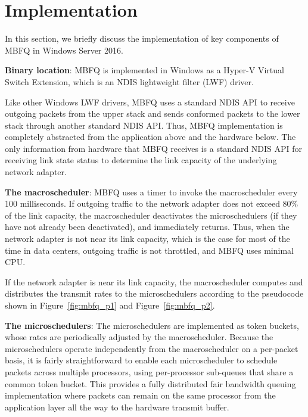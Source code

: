 \section{Implementation}
\label{sec:implementation}
In this section, we briefly discuss the implementation of key components of MBFQ in Windows
Server 2016.

{\bf Binary location}: MBFQ is implemented in Windows as a Hyper-V Virtual Switch Extension, 
which is an NDIS lightweight filter (LWF) driver.

Like other Windows LWF drivers, MBFQ uses a standard NDIS API to receive outgoing packets
from the upper stack and 
sends conformed packets to the lower stack through another standard NDIS API.
Thus, MBFQ implementation is completely abstracted from the application above and the 
hardware below.  The only information from hardware that MBFQ receives is a standard NDIS API 
for receiving link state status to determine the link capacity of the underlying network adapter.

{\bf The macroscheduler}: MBFQ uses a timer to invoke the macroscheduler every 100 milliseconds.
If outgoing traffic to the network adapter does not exceed 80\% of the link capacity, the
macroscheduler deactivates the microschedulers (if they have not already been deactivated), and
immediately returns.  Thus, when the network adapter is not near its link capacity, which is the case
for most of the time in data centers, outgoing traffic is not throttled, and MBFQ uses minimal CPU.

If the network adapter is near its link capacity, the macroscheduler computes and distributes the
transmit rates to the microschedulers according to the pseudocode shown in  
Figure~\ref{fig:mbfq_p1} and Figure~\ref{fig:mbfq_p2}.

{\bf The microschedulers}: The microschedulers are implemented as token buckets, whose rates are
periodically adjusted by the macroscheduler. Because the microschedulers operate independently from
the macroscheduler on a per-packet basis, it is fairly straightforward to enable each microscheduler to 
schedule packets across multiple processors, using per-processor sub-queues that share a common 
token bucket. This provides a fully distributed fair bandwidth queuing implementation where packets can remain
on the same processor from the application layer all the way to the hardware transmit buffer.


